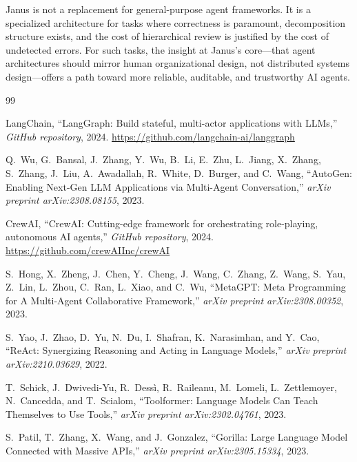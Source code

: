\documentclass[11pt,a4paper]{article}
\begin{document}
Janus is not a replacement for general-purpose agent frameworks.
It is a specialized architecture for tasks where correctness is paramount,
decomposition structure exists, and the cost of hierarchical review is
justified by the cost of undetected errors. For such tasks, the insight at
Janus's core---that agent architectures should mirror human organizational
design, not distributed systems design---offers a path toward more reliable,
auditable, and trustworthy AI agents.


\begin{thebibliography}{99}

LangChain, ``LangGraph: Build stateful, multi-actor applications with LLMs,''
\emph{GitHub repository}, 2024.
\url{https://github.com/langchain-ai/langgraph}

Q.~Wu, G.~Bansal, J.~Zhang, Y.~Wu, B.~Li, E.~Zhu, L.~Jiang, X.~Zhang,
S.~Zhang, J.~Liu, A.~Awadallah, R.~White, D.~Burger, and C.~Wang,
``AutoGen: Enabling Next-Gen LLM Applications via Multi-Agent Conversation,''
\emph{arXiv preprint arXiv:2308.08155}, 2023.

CrewAI, ``CrewAI: Cutting-edge framework for orchestrating role-playing,
autonomous AI agents,'' \emph{GitHub repository}, 2024.
\url{https://github.com/crewAIInc/crewAI}

S.~Hong, X.~Zheng, J.~Chen, Y.~Cheng, J.~Wang, C.~Zhang, Z.~Wang,
S.~Yau, Z.~Lin, L.~Zhou, C.~Ran, L.~Xiao, and C.~Wu,
``MetaGPT: Meta Programming for A Multi-Agent Collaborative Framework,''
\emph{arXiv preprint arXiv:2308.00352}, 2023.

S.~Yao, J.~Zhao, D.~Yu, N.~Du, I.~Shafran, K.~Narasimhan, and Y.~Cao,
``ReAct: Synergizing Reasoning and Acting in Language Models,''
\emph{arXiv preprint arXiv:2210.03629}, 2022.

T.~Schick, J.~Dwivedi-Yu, R.~Dess\`i, R.~Raileanu, M.~Lomeli, L.~Zettlemoyer,
N.~Cancedda, and T.~Scialom, ``Toolformer: Language Models Can Teach
Themselves to Use Tools,'' \emph{arXiv preprint arXiv:2302.04761}, 2023.

S.~Patil, T.~Zhang, X.~Wang, and J.~Gonzalez, ``Gorilla: Large Language
Model Connected with Massive APIs,'' \emph{arXiv preprint arXiv:2305.15334},
2023.


\end{thebibliography}
\end{document}
